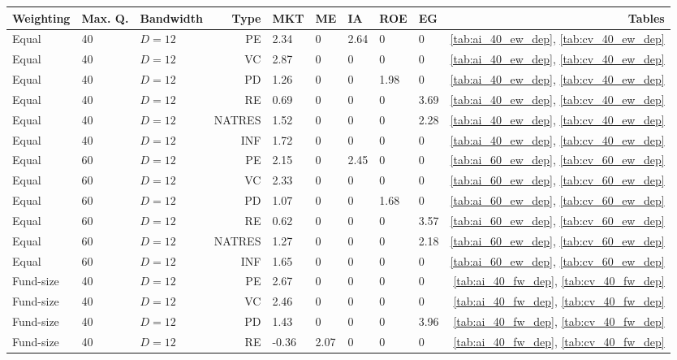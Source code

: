 \documentclass[12pt]{article}
\begin{document}
\begin{table}[ht]
	\centering
	\begin{tabular}{lllrlllllr}
		Weighting & Max. Q. & Bandwidth & Type & MKT & ME & IA & ROE & EG & Tables \\ 
		\hline
		\hline
			Equal & 40 & $D=12$ & PE & 2.34 & 0 & 2.64 & 0 & 0 & \ref{tab:ai_40_ew_dep}, \ref{tab:cv_40_ew_dep} \\ 
		Equal & 40 & $D=12$ & VC & 2.87 & 0 & 0 & 0 & 0 & \ref{tab:ai_40_ew_dep}, \ref{tab:cv_40_ew_dep} \\ 
		Equal & 40 & $D=12$ & PD & 1.26 & 0 & 0 & 1.98 & 0 & \ref{tab:ai_40_ew_dep}, \ref{tab:cv_40_ew_dep} \\ 
		Equal & 40 & $D=12$ & RE & 0.69 & 0 & 0 & 0 & 3.69 & \ref{tab:ai_40_ew_dep}, \ref{tab:cv_40_ew_dep} \\ 
		Equal & 40 & $D=12$ & NATRES & 1.52 & 0 & 0 & 0 & 2.28 & \ref{tab:ai_40_ew_dep}, \ref{tab:cv_40_ew_dep} \\ 
		Equal & 40 & $D=12$ & INF & 1.72 & 0 & 0 & 0 & 0 & \ref{tab:ai_40_ew_dep}, \ref{tab:cv_40_ew_dep} \\ 
		\hline
		Equal & 60 & $D=12$ & PE & 2.15 & 0 & 2.45 & 0 & 0 & \ref{tab:ai_60_ew_dep}, \ref{tab:cv_60_ew_dep} \\ 
		Equal & 60 & $D=12$ & VC & 2.33 & 0 & 0 & 0 & 0 & \ref{tab:ai_60_ew_dep}, \ref{tab:cv_60_ew_dep} \\ 
		Equal & 60 & $D=12$ & PD & 1.07 & 0 & 0 & 1.68 & 0 & \ref{tab:ai_60_ew_dep}, \ref{tab:cv_60_ew_dep} \\ 
		Equal & 60 & $D=12$ & RE & 0.62 & 0 & 0 & 0 & 3.57 & \ref{tab:ai_60_ew_dep}, \ref{tab:cv_60_ew_dep} \\ 
		Equal & 60 & $D=12$ & NATRES & 1.27 & 0 & 0 & 0 & 2.18 & \ref{tab:ai_60_ew_dep}, \ref{tab:cv_60_ew_dep} \\ 
		Equal & 60 & $D=12$ & INF & 1.65 & 0 & 0 & 0 & 0 & \ref{tab:ai_60_ew_dep}, \ref{tab:cv_60_ew_dep} \\ 
		\hline
		\hline
		Fund-size & 40 & $D=12$ & PE & 2.67 & 0 & 0 & 0 & 0 & \ref{tab:ai_40_fw_dep}, \ref{tab:cv_40_fw_dep} \\ 
		Fund-size & 40 & $D=12$ & VC & 2.46 & 0 & 0 & 0 & 0 & \ref{tab:ai_40_fw_dep}, \ref{tab:cv_40_fw_dep} \\ 
		Fund-size & 40 & $D=12$ & PD & 1.43 & 0 & 0 & 0 & 3.96 & \ref{tab:ai_40_fw_dep}, \ref{tab:cv_40_fw_dep} \\ 
		Fund-size & 40 & $D=12$ & RE & -0.36 & 2.07 & 0 & 0 & 0 & \ref{tab:ai_40_fw_dep}, \ref{tab:cv_40_fw_dep} \\ 

\end{tabular}
\end{table}
\end{document}
